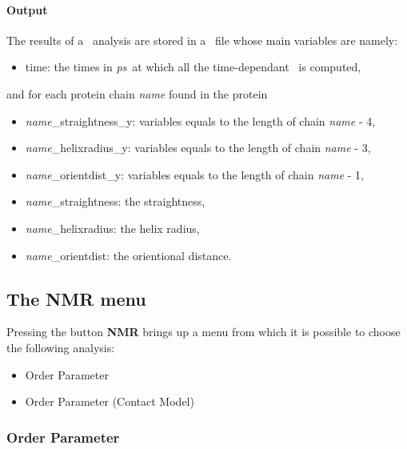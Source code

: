 \documentclass[a4paper,11pt]{report}
\newcommand{\ps}{\textit{ps}}
\begin{document}
\paragraph{Output\\}
The results of a \SD\ analysis are stored in a \NetCDF\ file whose main variables are namely:
\begin{itemize}
\item time: the times in \ps\ at which all the time-dependant \SFA\ is computed,
\end{itemize}
and for each protein chain \textit{name} found in the protein
\begin{itemize}
\item \textit{name}\_straightness\_y: variables equals to the length of chain \textit{name} - 4,
\item \textit{name}\_helixradius\_y: variables equals to the length of chain \textit{name} - 3,
\item \textit{name}\_orientdist\_y: variables equals to the length of chain \textit{name} - 1,
\item \textit{name}\_straightness: the straightness,
\item \textit{name}\_helixradius: the helix radius,
\item \textit{name}\_orientdist: the orientional distance.
\end{itemize}

\subsection{The NMR menu}
\label{nmr_menu}
Pressing the button \textbf{NMR} brings up a menu from which it is possible to choose the following analysis:
\begin{itemize}
\item Order Parameter
\item Order Parameter (Contact Model)
\end{itemize}

\subsubsection{Order Parameter}
\label{op}
\end{document}
